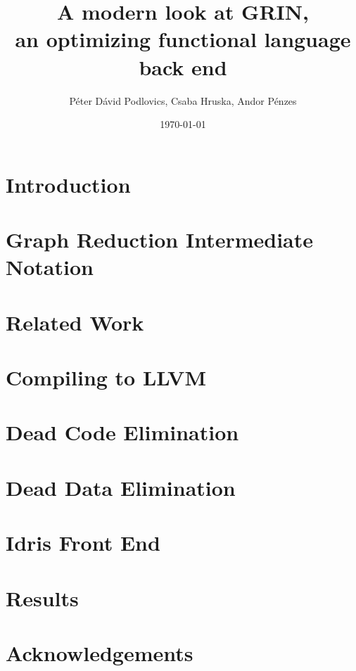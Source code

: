 \documentclass[10pt,a4paper,oneside]{article}
\title{\vspace{-2cm}A modern look at GRIN,\\ an optimizing functional language back end}
\date{\today}
\author{Péter Dávid Podlovics, Csaba Hruska, Andor Pénzes}
\begin{document}
	
	\maketitle
	
	
	\section{Introduction} \label{sec-intro}
	
	
	\section{Graph Reduction Intermediate Notation}
	
	
	\section{Related Work}
	
	
	\section{Compiling to LLVM}
	
	
	\section{Dead Code Elimination}
	
	
	\section{Dead Data Elimination} \label{sec:dde}
	
	
	\section{Idris Front End}
	
	
	\section{Results}
	
	
	
	
	\section*{Acknowledgements}
	
	
	

	
\end{document}
